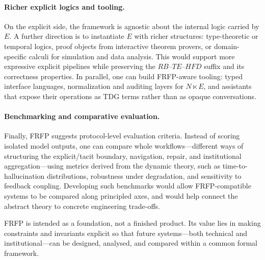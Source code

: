 \documentclass[11pt]{article}
\theoremstyle{definition}
\begin{document}
\paragraph{Richer explicit logics and tooling.}
On the explicit side, the framework is agnostic about the internal logic carried by \(E\). A further direction is to instantiate \(E\) with richer structures: type-theoretic or temporal logics, proof objects from interactive theorem provers, or domain-specific calculi for simulation and data analysis. This would support more expressive explicit pipelines while preserving the \(RB\)--\(TE\)--\(HFD\) suffix and its correctness properties. In parallel, one can build FRFP-aware tooling: typed interface languages, normalization and auditing layers for \(N \ltimes E\), and assistants that expose their operations as TDG terms rather than as opaque conversations.

\paragraph{Benchmarking and comparative evaluation.}
Finally, FRFP suggests protocol-level evaluation criteria. Instead of scoring isolated model outputs, one can compare whole workflows---different ways of structuring the explicit/tacit boundary, navigation, repair, and institutional aggregation---using metrics derived from the dynamic theory, such as time-to-hallucination distributions, robustness under degradation, and sensitivity to feedback coupling. Developing such benchmarks would allow FRFP-compatible systems to be compared along principled axes, and would help connect the abstract theory to concrete engineering trade-offs.

FRFP is intended as a foundation, not a finished product. Its value lies in making constraints and invariants explicit so that future systems---both technical and institutional---can be designed, analysed, and compared within a common formal framework.


\pagebreak
\appendix

\pagebreak

\pagebreak

\pagebreak

\pagebreak

\pagebreak

\pagebreak

\pagebreak

\pagebreak

\pagebreak

\pagebreak

\pagebreak

\end{document}
